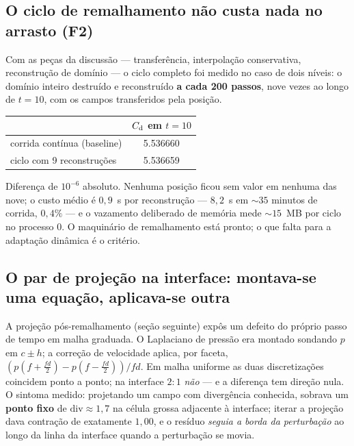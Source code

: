 \subsection{O ciclo de remalhamento não custa nada no arrasto (F2)}

Com as peças da discussão --- transferência, interpolação conservativa,
reconstrução de domínio --- o ciclo completo foi medido no caso de dois níveis:
o domínio inteiro destruído e reconstruído \textbf{a cada 200 passos}, nove
vezes ao longo de $t=10$, com os campos transferidos pela posição.

\begin{center}
\begin{tabular}{lS}
  \toprule
  & {$C_{\mathrm{d}}$ em $t=10$} \\
  \midrule
  corrida contínua (baseline)            & 5.536660 \\
  ciclo com 9 reconstruções               & 5.536659 \\
  \bottomrule
\end{tabular}
\end{center}

Diferença de $10^{-6}$ absoluto. Nenhuma posição ficou sem valor em nenhuma das
nove; o custo médio é $0{,}9$~s por reconstrução --- $8{,}2$~s em ${\sim}35$
minutos de corrida, $0{,}4\%$ --- e o vazamento deliberado de memória mede
${\sim}15$~MB por ciclo no processo 0. O maquinário de remalhamento está
pronto; o que falta para a adaptação dinâmica é o critério.

\subsection{O par de projeção na interface: montava-se uma equação, aplicava-se outra}

A projeção pós-remalhamento (seção seguinte) expôs um defeito do próprio passo
de tempo em malha graduada. O Laplaciano de pressão era montado sondando $p$ em
$c \pm h$; a correção de velocidade aplica, por faceta,
$(p(f+\tfrac{fd}{2}) - p(f-\tfrac{fd}{2}))/fd$. Em malha uniforme as duas
discretizações coincidem ponto a ponto; na interface $2{:}1$ \emph{não} --- e a
diferença tem direção nula. O sintoma medido: projetando um campo com
divergência conhecida, sobrava um \textbf{ponto fixo} de $\mathrm{div} \approx
1{,}7$ na célula grossa adjacente à interface; iterar a projeção dava contração
de exatamente $1{,}00$, e o resíduo \emph{seguia a borda da perturbação} ao
longo da linha da interface quando a perturbação se movia.

